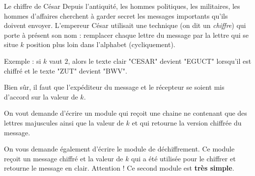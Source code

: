 \begin{Exercice}{Le chiffre de César}
	\label{ex:cesar}
	Depuis l'antiquité, les hommes politiques, les militaires, 
	les hommes d'affaires cherchent à garder secret les messages
	importants qu'ils doivent envoyer.
	L'empereur César utilisait une technique (on dit un \emph{chiffre})
	qui porte à présent son nom :
	remplacer chaque lettre du message par la lettre qui se situe 
	$k$ position plus loin dans l'alphabet (cycliquement).
	
	Exemple : si $k$ vaut $2$, 
	alors le texte clair "CESAR" devient "EGUCT" lorsqu'il est chiffré 
	et le texte "ZUT" devient "BWV".
	
	Bien sûr, il faut que l'expéditeur du message et le récepteur
	se soient mis d'accord sur la valeur de $k$.
	
	On vout demande d'écrire un module qui reçoit une chaine ne contenant
	que des lettres majuscules ainsi que la valeur de $k$ et qui retourne
	la version chiffrée du message.

	On vous demande également d'écrire le module de déchiffrement.
	Ce module reçoit un message chiffré et la valeur de $k$ qui a été
	utilisée pour le chiffrer et retourne le message en clair.
	Attention ! Ce second module est \textbf{très simple}.

	\begin{Solution}
	\end{Solution}
	
\end{Exercice}



